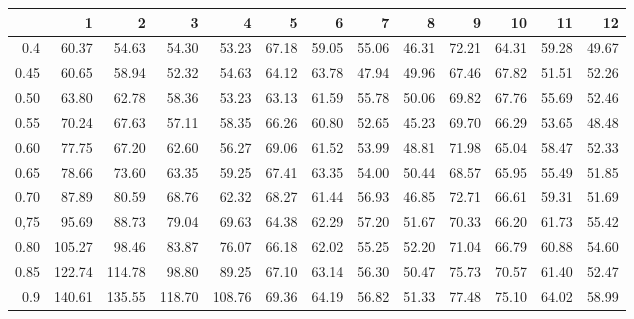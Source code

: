 \begin{table}[ht]
\centering
\begin{tabular}{rrrrrrrrrrrrr}
  \hline
 & 1 & 2 & 3 & 4 & 5 & 6 & 7 & 8 & 9 & 10 & 11 & 12 \\ 
  \hline
0.4 & 60.37 & 54.63 & 54.30 & 53.23 & 67.18 & 59.05 & 55.06 & 46.31 & 72.21 & 64.31 & 59.28 & 49.67 \\ 
  0.45 & 60.65 & 58.94 & 52.32 & 54.63 & 64.12 & 63.78 & 47.94 & 49.96 & 67.46 & 67.82 & 51.51 & 52.26 \\ 
  0.50 & 63.80 & 62.78 & 58.36 & 53.23 & 63.13 & 61.59 & 55.78 & 50.06 & 69.82 & 67.76 & 55.69 & 52.46 \\ 
  0.55 & 70.24 & 67.63 & 57.11 & 58.35 & 66.26 & 60.80 & 52.65 & 45.23 & 69.70 & 66.29 & 53.65 & 48.48 \\ 
  0.60 & 77.75 & 67.20 & 62.60 & 56.27 & 69.06 & 61.52 & 53.99 & 48.81 & 71.98 & 65.04 & 58.47 & 52.33 \\ 
  0.65 & 78.66 & 73.60 & 63.35 & 59.25 & 67.41 & 63.35 & 54.00 & 50.44 & 68.57 & 65.95 & 55.49 & 51.85 \\ 
  0.70 & 87.89 & 80.59 & 68.76 & 62.32 & 68.27 & 61.44 & 56.93 & 46.85 & 72.71 & 66.61 & 59.31 & 51.69 \\ 
  0,75 & 95.69 & 88.73 & 79.04 & 69.63 & 64.38 & 62.29 & 57.20 & 51.67 & 70.33 & 66.20 & 61.73 & 55.42 \\ 
  0.80 & 105.27 & 98.46 & 83.87 & 76.07 & 66.18 & 62.02 & 55.25 & 52.20 & 71.04 & 66.79 & 60.88 & 54.60 \\ 
  0.85 & 122.74 & 114.78 & 98.80 & 89.25 & 67.10 & 63.14 & 56.30 & 50.47 & 75.73 & 70.57 & 61.40 & 52.47 \\ 
  0.9 & 140.61 & 135.55 & 118.70 & 108.76 & 69.36 & 64.19 & 56.82 & 51.33 & 77.48 & 75.10 & 64.02 & 58.99 \\ 
   \hline
\end{tabular}
\end{table}
